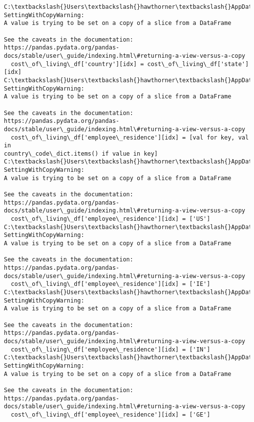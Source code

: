 \documentclass[11pt]{article}
\begin{document}
    \begin{Verbatim}[commandchars=\\\{\}]
C:\textbackslash{}Users\textbackslash{}hawthorner\textbackslash{}AppData\textbackslash{}Local\textbackslash{}Temp\textbackslash{}ipykernel\_22188\textbackslash{}3238637228.py:7:
SettingWithCopyWarning:
A value is trying to be set on a copy of a slice from a DataFrame

See the caveats in the documentation: https://pandas.pydata.org/pandas-
docs/stable/user\_guide/indexing.html\#returning-a-view-versus-a-copy
  cost\_of\_living\_df['country'][idx] = cost\_of\_living\_df['state'][idx]
C:\textbackslash{}Users\textbackslash{}hawthorner\textbackslash{}AppData\textbackslash{}Local\textbackslash{}Temp\textbackslash{}ipykernel\_22188\textbackslash{}3238637228.py:10:
SettingWithCopyWarning:
A value is trying to be set on a copy of a slice from a DataFrame

See the caveats in the documentation: https://pandas.pydata.org/pandas-
docs/stable/user\_guide/indexing.html\#returning-a-view-versus-a-copy
  cost\_of\_living\_df['employee\_residence'][idx] = [val for key, val in
country\_code\_dict.items() if value in key]
C:\textbackslash{}Users\textbackslash{}hawthorner\textbackslash{}AppData\textbackslash{}Local\textbackslash{}Temp\textbackslash{}ipykernel\_22188\textbackslash{}3238637228.py:16:
SettingWithCopyWarning:
A value is trying to be set on a copy of a slice from a DataFrame

See the caveats in the documentation: https://pandas.pydata.org/pandas-
docs/stable/user\_guide/indexing.html\#returning-a-view-versus-a-copy
  cost\_of\_living\_df['employee\_residence'][idx] = ['US']
C:\textbackslash{}Users\textbackslash{}hawthorner\textbackslash{}AppData\textbackslash{}Local\textbackslash{}Temp\textbackslash{}ipykernel\_22188\textbackslash{}3238637228.py:20:
SettingWithCopyWarning:
A value is trying to be set on a copy of a slice from a DataFrame

See the caveats in the documentation: https://pandas.pydata.org/pandas-
docs/stable/user\_guide/indexing.html\#returning-a-view-versus-a-copy
  cost\_of\_living\_df['employee\_residence'][idx] = ['IE']
C:\textbackslash{}Users\textbackslash{}hawthorner\textbackslash{}AppData\textbackslash{}Local\textbackslash{}Temp\textbackslash{}ipykernel\_22188\textbackslash{}3238637228.py:18:
SettingWithCopyWarning:
A value is trying to be set on a copy of a slice from a DataFrame

See the caveats in the documentation: https://pandas.pydata.org/pandas-
docs/stable/user\_guide/indexing.html\#returning-a-view-versus-a-copy
  cost\_of\_living\_df['employee\_residence'][idx] = ['IN']
C:\textbackslash{}Users\textbackslash{}hawthorner\textbackslash{}AppData\textbackslash{}Local\textbackslash{}Temp\textbackslash{}ipykernel\_22188\textbackslash{}3238637228.py:22:
SettingWithCopyWarning:
A value is trying to be set on a copy of a slice from a DataFrame

See the caveats in the documentation: https://pandas.pydata.org/pandas-
docs/stable/user\_guide/indexing.html\#returning-a-view-versus-a-copy
  cost\_of\_living\_df['employee\_residence'][idx] = ['GE']
    \end{Verbatim}
\end{document}
